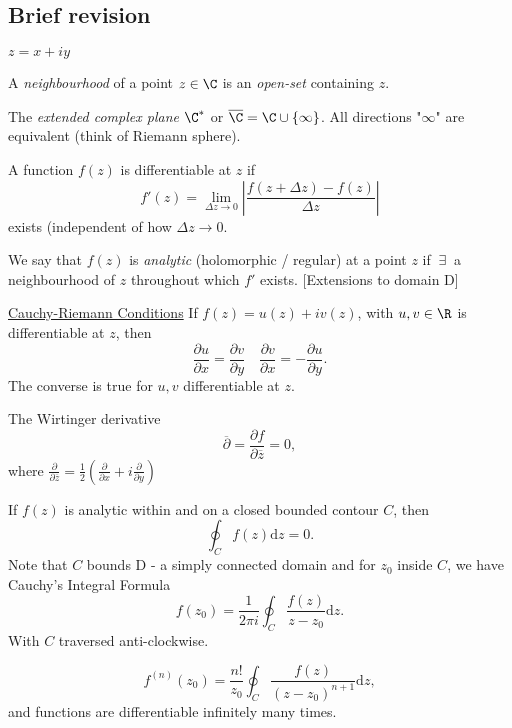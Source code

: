\documentclass[a4paper]{article}
\begin{document}
\subsection{Brief revision}
$z = x + iy$
\begin{defi}[Neighbourhood]
    A \emph{neighbourhood} of a point $z \in  \C$ is an \emph{open-set} containing $z$.
\end{defi}
\begin{defi}
    The \emph{extended complex plane} $\C^{\ast}$ or $\overline{\C} = \C \cup \{ \infty\} $. All directions "$\infty$" are equivalent (think of Riemann sphere).
\end{defi}
\begin{defi}[Differentiable]
    A function $f(z)$ is differentiable at $z$ if
    \[
        f'(z) = \lim_{ \Delta z \to 0} \left| \frac{f(z + \Delta z) - f(z)}{\Delta z} \right| 
    \]
    exists (independent of how $\Delta z \to 0$.
\end{defi}
\begin{defi}[Analytic]
    We say that $f(z)$ is \emph{analytic} (holomorphic / regular) at a point $z$ if $\ \exists \  $ a neighbourhood of $z$ throughout which $f '$ exists. [Extensions to domain D]
\end{defi}
\underline{Cauchy-Riemann Conditions}
If $f(z) =  u(z) + i v(z)$, with $u, v \in  \R$ is differentiable at $z $, then
\[
\frac{\partial u}{\partial x}  = \frac{\partial v}{\partial y}  \quad \frac{\partial v}{\partial x}  = - \frac{\partial u}{\partial y} 
.\] 
The converse is true for $u, v$ differentiable at $z$.
\begin{cor}
    The Wirtinger derivative 
    \[
    \overline{\partial} = \frac{\partial f}{\partial \overline{z}}  = 0
    ,\]
    where $\frac{\partial }{\partial \overline{z}} = \frac{1}{2} (\frac{\partial }{\partial x}  + i \frac{\partial }{\partial y} )$
    
\end{cor}
\begin{thm}
    If $f(z)$ is analytic within and on a closed bounded contour $C$, then
    \[
        \oint_C f(z) \text{d}z = 0
    .\]
    Note that $C$ bounds  D - a simply connected domain and for $z_0$ inside $C$, we have Cauchy's Integral Formula
    \[
        f(z_0) = \frac{1}{2 \pi i} \oint_C \frac{f(z)}{ z - z_0} \text{d}z
    .\] 
    With $C$ traversed anti-clockwise.
\end{thm}
\begin{cor}
    \[
        f^{(n)}(z_0) = \frac{n!}{z_0} \oint_C \frac{f(z)}{ ( z - z_0)^{n + 1}} \text{d}z
    ,\]
    and functions are differentiable infinitely many times.
\end{cor}
\end{document}
